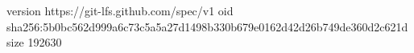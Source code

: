 version https://git-lfs.github.com/spec/v1
oid sha256:5b0bc562d999a6c73c5a5a27d1498b330b679e0162d42d26b749de360d2c621d
size 192630
